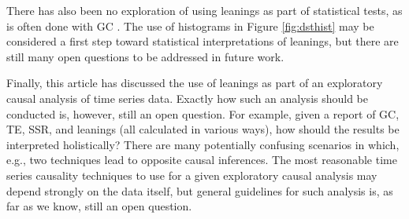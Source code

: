 \documentclass[twocolumn,aps,pre,groupedaddress]{revtex4-1}
\begin{document}
There has also been no exploration of using leanings as part of statistical tests, as is often done with GC \cite{Pierce1977}.  The use of histograms in Figure \ref{fig:dsthist} may be considered a first step toward statistical interpretations of leanings, but there are still many open questions to be addressed in future work.

Finally, this article has discussed the use of leanings as part of an exploratory causal analysis of time series data.  Exactly how such an analysis should be conducted is, however, still an open question.  For example, given a report of GC, TE, SSR, and leanings (all calculated in various ways), how should the results be interpreted holistically?  There are many potentially confusing scenarios in which, e.g., two techniques lead to opposite causal inferences.  The most reasonable time series causality techniques to use for a given exploratory causal analysis may depend strongly on the data itself, but general guidelines for such analysis is, as far as we know, still an open question.




\end{document}
